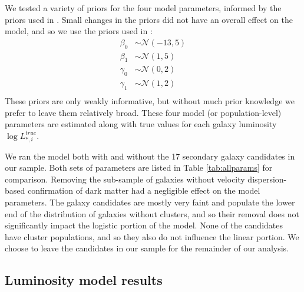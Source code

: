 \documentclass[twocolumn]{aastex631}
\begin{document}
We tested a variety of priors for the four model parameters, informed by the priors used in . Small changes in the priors did not have an overall effect on the model, and so we use the priors used in : 
\begin{align*}
    \beta_0 &\sim \mathcal{N}(-13,5) \\
    \beta_1 &\sim \mathcal{N}(1,5) \\
    \gamma_0 &\sim \mathcal{N}(0,2) \\
    \gamma_1 &\sim \mathcal{N}(1,2) \\
\end{align*}
These priors are only weakly informative, but without much prior knowledge we prefer to leave them relatively broad. These four model (or population-level) parameters are estimated along with true values for each galaxy luminosity $\log{L_{*,i}^{true}}$. 

We ran the model both with and without the 17 secondary galaxy candidates in our sample. Both sets of parameters are listed in Table \ref{tab:allparams} for comparison. Removing the sub-sample of galaxies without velocity dispersion-based confirmation of dark matter had a negligible effect on the model parameters. The galaxy candidates are mostly very faint and populate the lower end of the distribution of galaxies without clusters, and so their removal does not significantly impact the logistic portion of the model. None of the candidates have cluster populations, and so they also do not influence the linear portion. We choose to leave the candidates in our sample for the remainder of our analysis. 

\subsection{Luminosity model results} \label{subsec:lum_results}
\end{document}
